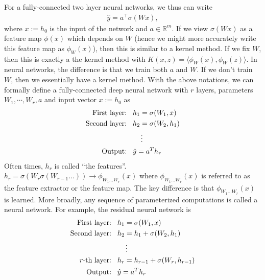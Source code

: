 For a fully-connected two layer neural networks, we thus can write
\begin{align*}
	\hat y = a^\top \sigma(Wx),
\end{align*}
where $x := h_0$ is the input of the network and $a \in \mathbb{R}^m$. If we view $\sigma(Wx)$ as a feature map $\phi(x)$ which depends on $W$ (hence we might more accurately write this feature map as $\phi_W (x)$), then this is similar to a kernel method. If we fix $W$, then this is exactly a the kernel method with $K(x,z) = \langle \phi_W(x), \phi_W(z) \rangle $. In neural networks, the difference is that we train both $a$ and $W$. If we don't train $W$, then we essentially have a kernel method. 
With the above notations, we can formally define a fully-connected deep neural network with $r$ layers, parameters $W_1, \cdots, W_r, a$ and input vector $ x:=h_0$ as
\begin{align*} 
\text{First layer:}\hspace{0.3cm}  &h_1 = \sigma(W_1,x) \\
\text{Second layer:}\hspace{0.3cm}  &h_2 = \sigma(W_2, h_1) \\
& \hspace{0.4cm} \vdots \\
 \text{Output:}\hspace{0.3cm} &\hat{y} = a^T h_r
\end{align*}
Often times, $h_r$ is called ``the features''. $h_r = \sigma(W_r \sigma(W_{r-1} \dots )) \rightarrow \phi_{W_1 \dots W_r}(x)$ where $\phi_{W_1 \dots W_r}(x)$ is referred to as the feature extractor or the feature map. The key difference is that $\phi_{W_1 \dots W_r}(x)$ is learned. More broadly, any sequence of parameterized computations is called a neural network. For example, the residual neural network is
\begin{align*} 
	\text{First layer:}\hspace{0.3cm}  &h_1 = \sigma(W_1,x) \\
	\text{Second layer:}\hspace{0.3cm}  &h_2 = h_1 + \sigma(W_2, h_1) \\
	& \hspace{0.4cm} \vdots \\
	r\text{-th layer:}\hspace{0.3cm}  &h_r = h_{r-1} + \sigma(W_r, h_{r-1}) \\
	\text{Output:}\hspace{0.3cm} &\hat{y} = a^T h_r
\end{align*}
